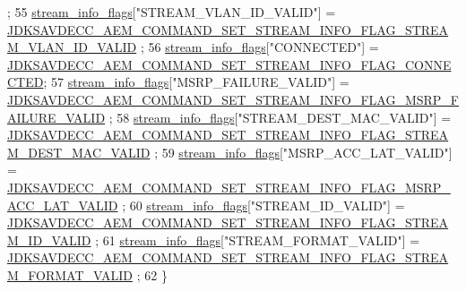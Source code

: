 \begin{DoxyCode}
      ;
55     \hyperlink{classavdecc__lib_1_1stream__output__descriptor__response__imp_a7a5f929ce40eaf804944218314bff706}{stream\_info\_flags}[\textcolor{stringliteral}{"STREAM\_VLAN\_ID\_VALID"}] = 
      \hyperlink{group__command__set__stream__info_gaea57b1e202c105ddca91ec6eba39eb4c}{JDKSAVDECC\_AEM\_COMMAND\_SET\_STREAM\_INFO\_FLAG\_STREAM\_VLAN\_ID\_VALID}
      ;
56     \hyperlink{classavdecc__lib_1_1stream__output__descriptor__response__imp_a7a5f929ce40eaf804944218314bff706}{stream\_info\_flags}[\textcolor{stringliteral}{"CONNECTED"}] = 
      \hyperlink{group__command__set__stream__info_ga621867bc1cb90adcde90d615fea5d8df}{JDKSAVDECC\_AEM\_COMMAND\_SET\_STREAM\_INFO\_FLAG\_CONNECTED};
57     \hyperlink{classavdecc__lib_1_1stream__output__descriptor__response__imp_a7a5f929ce40eaf804944218314bff706}{stream\_info\_flags}[\textcolor{stringliteral}{"MSRP\_FAILURE\_VALID"}] = 
      \hyperlink{group__command__set__stream__info_ga48cf25726faa693ebe64e3c71e38fd94}{JDKSAVDECC\_AEM\_COMMAND\_SET\_STREAM\_INFO\_FLAG\_MSRP\_FAILURE\_VALID}
      ;
58     \hyperlink{classavdecc__lib_1_1stream__output__descriptor__response__imp_a7a5f929ce40eaf804944218314bff706}{stream\_info\_flags}[\textcolor{stringliteral}{"STREAM\_DEST\_MAC\_VALID"}] = 
      \hyperlink{group__command__set__stream__info_gaeade7ce92575e0d1232858e16f73758d}{JDKSAVDECC\_AEM\_COMMAND\_SET\_STREAM\_INFO\_FLAG\_STREAM\_DEST\_MAC\_VALID}
      ;
59     \hyperlink{classavdecc__lib_1_1stream__output__descriptor__response__imp_a7a5f929ce40eaf804944218314bff706}{stream\_info\_flags}[\textcolor{stringliteral}{"MSRP\_ACC\_LAT\_VALID"}] = 
      \hyperlink{group__command__set__stream__info_ga7c2f2c6368e7392cb42642a18f3ac9b1}{JDKSAVDECC\_AEM\_COMMAND\_SET\_STREAM\_INFO\_FLAG\_MSRP\_ACC\_LAT\_VALID}
      ;
60     \hyperlink{classavdecc__lib_1_1stream__output__descriptor__response__imp_a7a5f929ce40eaf804944218314bff706}{stream\_info\_flags}[\textcolor{stringliteral}{"STREAM\_ID\_VALID"}] = 
      \hyperlink{group__command__set__stream__info_gae059f565078fc21696db193fc30ff3c2}{JDKSAVDECC\_AEM\_COMMAND\_SET\_STREAM\_INFO\_FLAG\_STREAM\_ID\_VALID}
      ;
61     \hyperlink{classavdecc__lib_1_1stream__output__descriptor__response__imp_a7a5f929ce40eaf804944218314bff706}{stream\_info\_flags}[\textcolor{stringliteral}{"STREAM\_FORMAT\_VALID"}] = 
      \hyperlink{group__command__set__stream__info_gaabb21b3ace105a9429a38a3a2cdfff14}{JDKSAVDECC\_AEM\_COMMAND\_SET\_STREAM\_INFO\_FLAG\_STREAM\_FORMAT\_VALID}
      ;
62 \}
\end{DoxyCode}


